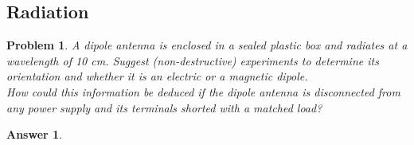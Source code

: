 \documentclass[a4paper]{article}
\newtheorem{ans}{Answer}[section]
\theoremstyle{new}
\newtheorem{qns}{Problem}[section]
\begin{document}
\subsection*{Radiation}
\begin{qns}
A dipole antenna is enclosed in a sealed plastic box and radiates at a wavelength of 10 cm. Suggest (non-destructive) experiments to determine its orientation and whether it is an electric or a magnetic dipole.\\[5pt]
How could this information be deduced if the dipole antenna is disconnected from any power supply and its terminals shorted with a matched load?
\end{qns}
\begin{ans}

\end{ans}
\end{document}
